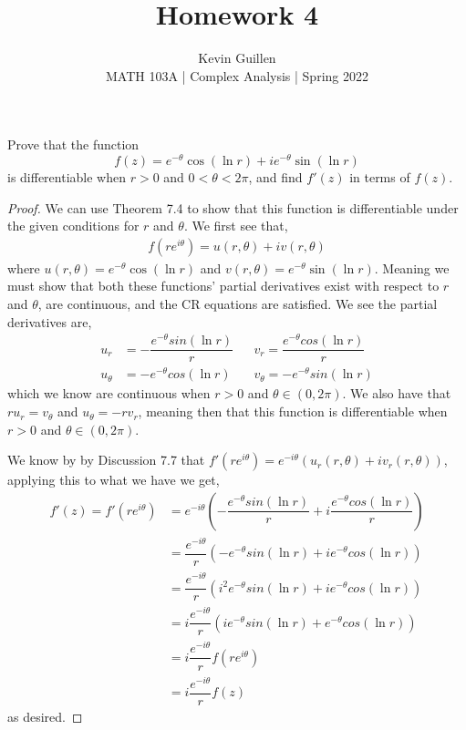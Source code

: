 \documentclass[11pt]{article}
\newenvironment{problem}[2][Problem\!]{\begin{trivlist}
\item[\hskip \labelsep {\bfseries #1}\hskip \labelsep {\bfseries #2}]}{\end{trivlist}}
\newcommand{\lrp}[1]{\left(#1\right)}
\begin{document}
 
\title{Homework 4}
\author{Kevin Guillen\\[0.5em]
MATH 103A  | Complex Analysis | Spring 2022}
\date{} 
\maketitle


\begin{problem}{4.1}
Prove that the function
\[f(z) = e^{-\theta}\cos(\ln r) + ie^{-\theta}\sin(\ln r)\]
is differentiable when $r > 0$ and $0 < \theta < 2\pi$, and find $f'(z)$ in terms of $f(z)$.
\end{problem}
\begin{proof}
  We can use Theorem 7.4 to show that this function is differentiable under the given conditions for $r$ and $\theta$. We first see that,
  \begin{align*}
    f(re^{i\theta}) = u(r, \theta) + iv(r, \theta)
  \end{align*}
  where $u(r,\theta) = e^{-\theta}\cos(\ln r)$ and $v(r,\theta) = e^{-\theta}\sin(\ln r)$. Meaning we must show that both these functions' partial derivatives exist with respect to $r$ and $\theta$, are continuous, and the CR equations are satisfied. We see the partial derivatives are,
  \begin{align*}
    u_r &= -\dfrac{e^{-\theta}sin(\ln r)}{r} && v_r = \dfrac{e^{-\theta}cos(\ln r)}{r} \\
    u_\theta &=-e^{-\theta}cos(\ln r) && v_\theta = -e^{-\theta}sin(\ln r)
  \end{align*}
  which we know are continuous when $r > 0$ and $\theta \in (0, 2\pi)$. We also have that $r u_r = v_\theta$ and $u_\theta = -rv_r$, meaning then that this function is differentiable when $r > 0$ and $\theta \in (0, 2\pi)$. 

  We know by by Discussion 7.7 that $f'(re^{i\theta}) = e^{-i\theta}(u_r(r,\theta) + iv_r(r,\theta))$, applying this to what we have we get,
  \begin{align*}
    f'(z) = f'(re^{i\theta}) &= e^{-i\theta}\lrp{-\dfrac{e^{-\theta}sin(\ln r)}{r} + i\dfrac{e^{-\theta}cos(\ln r)}{r}} \\
    &= \dfrac{e^{-i\theta}}{r}(-e^{-\theta}sin(\ln r) +ie^{-\theta}cos(\ln r)) \\
    &= \dfrac{e^{-i\theta}}{r}(i^{2}e^{-\theta}sin(\ln r) +ie^{-\theta}cos(\ln r)) \\
    &= i\dfrac{e^{-i\theta}}{r}(ie^{-\theta}sin(\ln r) +e^{-\theta}cos(\ln r)) \\
    &= i\dfrac{e^{-i\theta}}{r}f(re^{i\theta}) \\
    &= i\dfrac{e^{-i\theta}}{r}f(z)
  \end{align*}
  as desired.
\end{proof}
\end{document}
